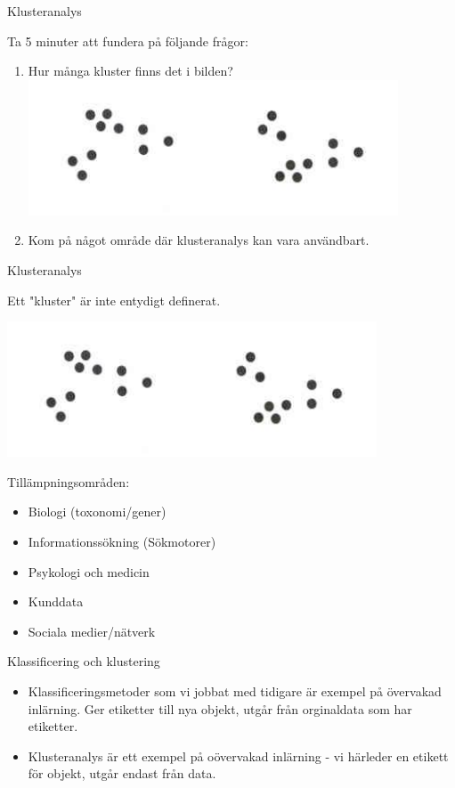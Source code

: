 \documentclass[10pt,english]{beamer}
\begin{document}
\begin{frame}{Klusteranalys}

    Ta 5 minuter att fundera på följande frågor:

    \begin{enumerate}
        \item Hur många kluster finns det i bilden?
        \includegraphics[width = .7\textwidth]{figs/kluster1.png}
        \item Kom på något område där klusteranalys kan vara användbart.
    \end{enumerate}
    
\end{frame}

\begin{frame}{Klusteranalys}
    
    Ett "kluster" är inte entydigt definerat.

    \includegraphics[width = .7\textwidth]{figs/kluster1.png}

    Tillämpningsområden:
    \begin{itemize}
        \item Biologi (toxonomi/gener)
        \item Informationssökning (Sökmotorer)
        \item Psykologi och medicin
        \item Kunddata
        \item Sociala medier/nätverk
    \end{itemize}

\end{frame}

\begin{frame}{Klassificering och klustering}

    \begin{itemize}
        \item Klassificeringsmetoder som vi jobbat med tidigare är exempel på övervakad inlärning. Ger etiketter till nya objekt, utgår från orginaldata som har etiketter.
        \item Klusteranalys är ett exempel på oövervakad inlärning - vi härleder en etikett för objekt, utgår endast från data.
    \end{itemize}
    
\end{frame}
\end{document}
